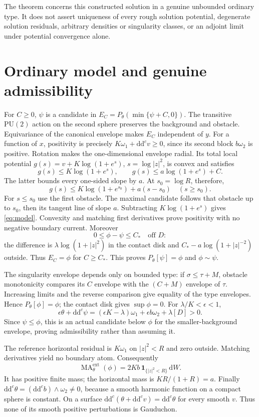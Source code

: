 \documentclass[11pt]{article}
\newcommand{\ddc}{\mathrm{d}\mathrm{d}^c}
\newcommand{\MA}{\operatorname{MA}}
\begin{document}
The theorem concerns this constructed solution in a genuine unbounded
ordinary type. It does not assert uniqueness of every rough solution
potential, degenerate solution residuals, arbitrary densities or singularity
classes, or an adjoint limit under potential convergence alone.

\section{Ordinary model and genuine admissibility}

For $C\ge0$, $\psi$ is a candidate in
$E_C=P_\theta(\min\{\psi+C,0\})$. The transitive $\mathrm{PU}(2)$ action
on the second sphere preserves the background and obstacle. Equivariance
of the canonical envelope makes $E_C$ independent of $y$. For a function
of $x$, positivity is precisely $K\omega_1+\ddc v\ge0$, since its second
block $b\omega_2$ is positive. Rotation makes the one-dimensional envelope
radial. Its total local potential
$g(s)=v+K\log(1+e^s)$, $s=\log|z|^2$, is convex and satisfies
\[
 g(s)\le K\log(1+e^s),\qquad g(s)\le a\log(1+e^s)+C.
\]
The latter bounds every one-sided slope by $a$. At $s_0=\log R$, therefore,
\[
 g(s)\le K\log(1+e^{s_0})+a(s-s_0)\quad(s\ge s_0).
\]
For $s\le s_0$ use the first obstacle. The maximal candidate follows that
obstacle up to $s_0$, then its tangent line of slope $a$. Subtracting
$K\log(1+e^s)$ gives \eqref{eq:model}. Convexity and matching first
derivatives prove positivity with no negative boundary current. Moreover
\[
 0\le\phi-\psi\le C_*\quad\text{off }D:
\]
the difference is $\lambda\log(1+|z|^2)$ in the contact disk and
$C_*-a\log(1+|z|^{-2})$ outside. Thus $E_C=\phi$ for $C\ge C_*$.
This proves $P_\theta[\psi]=\phi$ and $\phi\sim\psi$.

The singularity envelope depends only on bounded type: if
$\sigma\le\tau+M$, obstacle monotonicity compares its $C$ envelope with
the $(C+M)$ envelope of $\tau$. Increasing limits and the reverse comparison
give equality of the type envelopes. Hence $P_\theta[\phi]=\phi$;
the contact disk gives $\sup\phi=0$. For $\lambda/K<\epsilon<1$,
\[
 \epsilon\theta+\ddc\psi
 =(\epsilon K-\lambda)\omega_1+\epsilon b\omega_2+\lambda[D]>0.
\]
Since $\psi\le\phi$, this is an actual candidate below $\phi$ for the
smaller-background envelope, proving admissibility rather than assuming it.

The reference horizontal residual is $K\omega_1$ on $|z|^2<R$ and zero
outside. Matching derivatives yield no boundary atom. Consequently
\[
 \MA^{\mathrm{ext}}_\theta(\phi)
 =2Kb\,\mathbf1_{\{|z|^2<R\}}\,\mathrm{d}W.
\]
It has positive finite mass; the horizontal mass is
$K R/(1+R)=a$. Finally $\ddc\theta=(\ddc b)\wedge\omega_2\ne0$,
because a smooth harmonic function on a compact sphere is constant.
On a surface $\ddc(\theta+\ddc v)=\ddc\theta$ for every smooth $v$.
Thus none of its smooth positive perturbations is Gauduchon.
\end{document}
